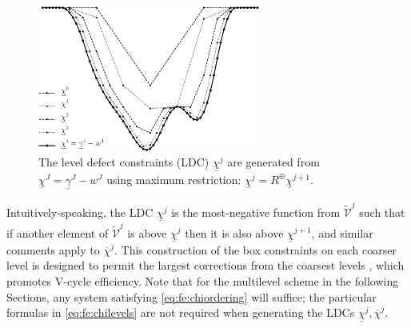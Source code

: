 \documentclass[letterpaper,final,12pt,reqno]{amsart}
\theoremstyle{cstyle}
\theoremstyle{cstyle*}
\theoremstyle{dstyle}
\numberwithin{equation}{section}
\numberwithin{figure}{section}
\numberwithin{table}{section}
\numberwithin{theorem}{section}
\newcommand{\maxR}{R^{\bm{\oplus}}}
\begin{document}
\begin{figure}[ht]
\includegraphics[width=0.65\textwidth]{fixfigs/chiphilevels.pdf}
\caption{The level defect constraints (LDC) $\underline{\chi}^j$ are generated from $\underline{\chi}^J = \underline{\gamma}^J - w^J$ using maximum restriction: $\underline{\chi}^j = \maxR \underline{\chi}^{j+1}$.}
\label{fig:chiphilevels}
\end{figure}

Intuitively-speaking, the LDC $\underline{\chi}^j$ is the most-negative function from $\tilde{\mathcal{V}}^j$ such that if another element of $\tilde{\mathcal{V}}^j$ is above $\underline{\chi}^j$ then it is also above $\underline{\chi}^{j+1}$, and similar comments apply to $\overline{\chi}^{j}$.  This construction of the box constraints on each coarser level is designed to permit the largest corrections from the coarsest levels \cite{GraeserKornhuber2009}, which promotes V-cycle efficiency.  Note that for the multilevel scheme in the following Sections, any system satisfying \eqref{eq:fe:chiordering} will suffice; the particular formulas in \eqref{eq:fe:chilevels} are not required when generating the LDCs $\underline{\chi}^{j},\overline{\chi}^{j}$.
\end{document}
